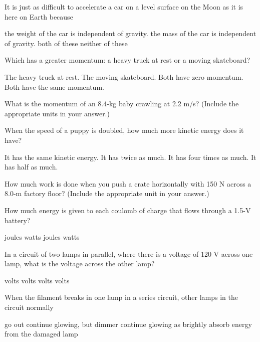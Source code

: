 \documentclass{exam}
\begin{document}
\begin{questions}
\newpage{}

\question It is just as difficult to accelerate a car on a level surface on the Moon as it is here on Earth because
\begin{choices}
  \choice the weight of the car is independent of gravity.
  \choice the mass of the car is independent of gravity.
  \choice both of these
  \choice neither of these
\end{choices}
\vfill{}

\question Which has a greater momentum: a heavy truck at rest or a moving skateboard?
\begin{choices}
  \choice The heavy truck at rest.
  \choice The moving skateboard.
  \choice Both have zero momentum.
  \choice Both have the same momentum.
\end{choices}
\vfill{}

\question
What is the momentum of an 8.4-kg baby crawling at 2.2 m/s? (Include the appropriate units in your answer.)

\vfill{}

\question When the speed of a puppy is doubled, how much more kinetic energy does it have?
\begin{choices}
  \choice It has the same kinetic energy.
  \choice It has twice as much.
  \choice It has four times as much.
  \choice It has half as much.
\end{choices}
\vfill{}

\question
How much work is done when you push a crate horizontally with 150 N across a 8.0-m factory floor? (Include the appropriate unit in your answer.)

\vfill{}

\newpage{}

\question How much energy is given to each coulomb of charge that flows through a 1.5-V battery?
\begin{choices}
   joules
   watts
   joules
   watts
\end{choices}
\vfill{}

\question In a circuit of two lamps in parallel, where there is a voltage of 120 V across one lamp, what is the voltage across the other lamp?
\begin{choices}
   volts
   volts
   volts
   volts
\end{choices}
\vfill{}

\question When the filament breaks in one lamp in a series circuit, other lamps in the circuit normally
\begin{choices}
  \choice go out
  \choice continue glowing, but dimmer
  \choice continue glowing as brightly
  \choice absorb energy from the damaged lamp
\end{choices}
\vfill{}


\end{questions}
\end{document}
